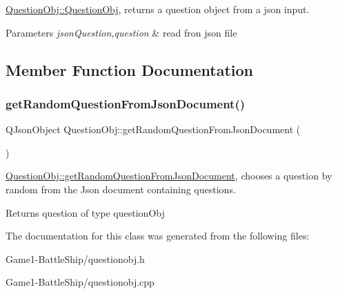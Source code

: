 \hyperlink{classQuestionObj_a6bdcb5f15f07cd5552597e3b03408ef2}{Question\+Obj\+::\+Question\+Obj}, returns a question object from a json input. 


\begin{DoxyParams}{Parameters}
{\em json\+Question,question} & read fron json file \\
\hline
\end{DoxyParams}


\subsection{Member Function Documentation}
\mbox{\label{classQuestionObj_a0211af0ca0084c025f5793c27a83f172}} 
\subsubsection{\texorpdfstring{get\+Random\+Question\+From\+Json\+Document()}{getRandomQuestionFromJsonDocument()}}
{\footnotesize\ttfamily Q\+Json\+Object Question\+Obj\+::get\+Random\+Question\+From\+Json\+Document (\begin{DoxyParamCaption}{ }\end{DoxyParamCaption})}



\hyperlink{classQuestionObj_a0211af0ca0084c025f5793c27a83f172}{Question\+Obj\+::get\+Random\+Question\+From\+Json\+Document}, chooses a question by random from the Json document containing questions. 

\begin{DoxyReturn}{Returns}
question of type question\+Obj 
\end{DoxyReturn}


The documentation for this class was generated from the following files\+:\begin{DoxyCompactItemize}
\item 
Game1-\/\+Battle\+Ship/questionobj.\+h\item 
Game1-\/\+Battle\+Ship/questionobj.\+cpp\end{DoxyCompactItemize}
